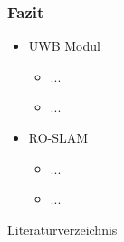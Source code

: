 \documentclass{beamer}
\begin{document}
%
%
\begin{frame}
	\frametitle{Fazit}
	\begin{itemize}
		\item UWB Modul
			\begin{itemize}
				\item ...
				\item ...
			\end{itemize}
		\item RO-SLAM
			\begin{itemize}
				\item ...
				\item ...
			\end{itemize}
	\end{itemize}
\end{frame}


%
% 
%
\begin{frame}[allowframebreaks]{Literaturverzeichnis}
	\printbibliography[
		heading=bibintoc,
		title={Literaturverzeichnis},
	]
\end{frame}


%
% 
%
\end{document}
